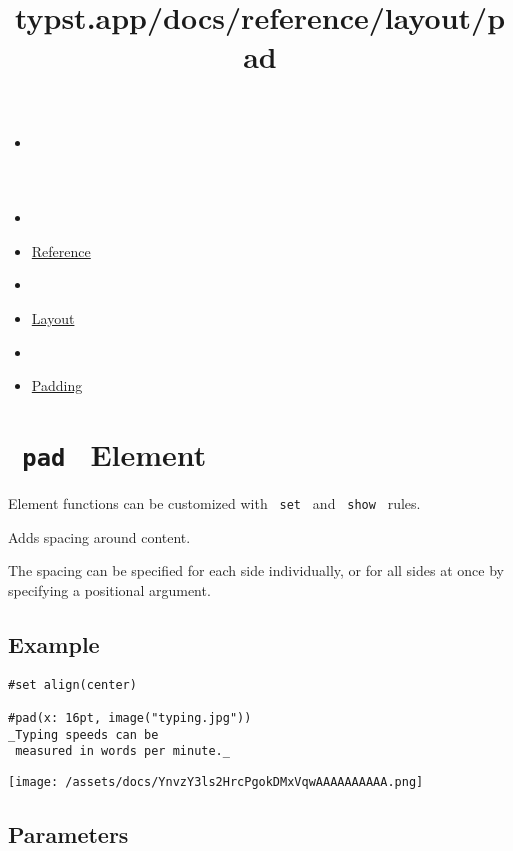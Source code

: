 \title{typst.app/docs/reference/layout/pad}

\begin{itemize}
\tightlist
\item
  \href{/docs}{}
\item
  
\item
  \href{/docs/reference/}{Reference}
\item
  
\item
  \href{/docs/reference/layout/}{Layout}
\item
  
\item
  \href{/docs/reference/layout/pad/}{Padding}
\end{itemize}

\section{\texorpdfstring{\texttt{\ pad\ } {{ Element
}}}{ pad   Element }}\label{summary}

\label{element-tooltip}
Element functions can be customized with \texttt{\ set\ } and
\texttt{\ show\ } rules.

Adds spacing around content.

The spacing can be specified for each side individually, or for all
sides at once by specifying a positional argument.

\subsection{Example}\label{example}

\begin{verbatim}
#set align(center)

#pad(x: 16pt, image("typing.jpg"))
_Typing speeds can be
 measured in words per minute._
\end{verbatim}

\texttt{[image: /assets/docs/YnvzY3ls2HrcPgokDMxVqwAAAAAAAAAA.png]}

\subsection{\texorpdfstring{{ Parameters
}}{ Parameters }}\label{parameters}

